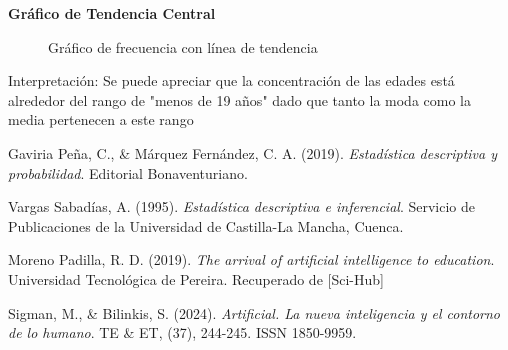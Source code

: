 \documentclass{article}
\begin{document}
	\textbf{Gráfico de Tendencia Central}
	\begin{figure}[h!]
		\centering
		\caption{Gráfico de frecuencia con línea de tendencia}
	\end{figure}
	
	Interpretación: Se puede apreciar que la concentración de las edades está alrededor del rango de "menos de 19 años" dado que tanto la moda como la media pertenecen a este rango

\begin{thebibliography}{9}

  Gaviria Peña, C., \& Márquez Fernández, C. A. (2019). \textit{Estadística descriptiva y probabilidad}. Editorial Bonaventuriano. 
  
  Vargas Sabadías, A. (1995). \textit{Estadística descriptiva e inferencial}. Servicio de Publicaciones de la Universidad de Castilla-La Mancha, Cuenca.

  Moreno Padilla, R. D. (2019). \textit{The arrival of artificial intelligence to education}. Universidad Tecnológica de Pereira. Recuperado de [Sci-Hub]

  Sigman, M., \& Bilinkis, S. (2024). \textit{Artificial. La nueva inteligencia y el contorno de lo humano}. TE \& ET, (37), 244-245. ISSN 1850-9959.

\end{thebibliography}
\end{document}
